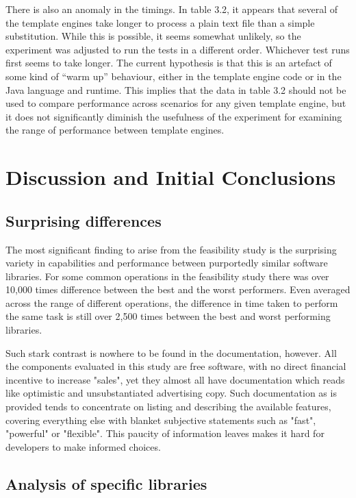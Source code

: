 There is also an anomaly in the timings. In table 3.2, it appears that several of the template engines take longer to process a plain text file than a simple substitution. While this is possible, it seems somewhat unlikely, so the experiment was adjusted to run the tests in a different order. Whichever test runs first seems to take longer. The current hypothesis is that this is an artefact of some kind of “warm up” behaviour, either in the template engine code or in the Java language and runtime. This implies that the data in table 3.2 should not be used to compare performance across scenarios for any given template engine, but it does not significantly diminish the usefulness of the experiment for examining the range of performance between template engines.

\section{Discussion and Initial Conclusions}
\label{section:feasibility discussion}


\subsection{Surprising differences}
The most significant finding to arise from the feasibility study is the surprising variety in capabilities and performance between purportedly similar software libraries. For some common operations in the feasibility study there was over 10,000 times difference between the best and the worst performers. Even averaged across the range of different operations, the difference in time taken to perform the same task is still over 2,500 times between the best and worst performing libraries.

Such stark contrast is nowhere to be found in the documentation, however. All the components evaluated in this study are free software, with no direct financial incentive to increase "sales", yet they almost all have documentation which reads like optimistic and unsubstantiated advertising copy. Such documentation as is provided tends to concentrate on listing and describing the available features, covering everything else with blanket subjective statements such as "fast", "powerful" or "flexible". This paucity of information leaves makes it hard for developers to make informed choices.

\subsection{Analysis of specific libraries}

